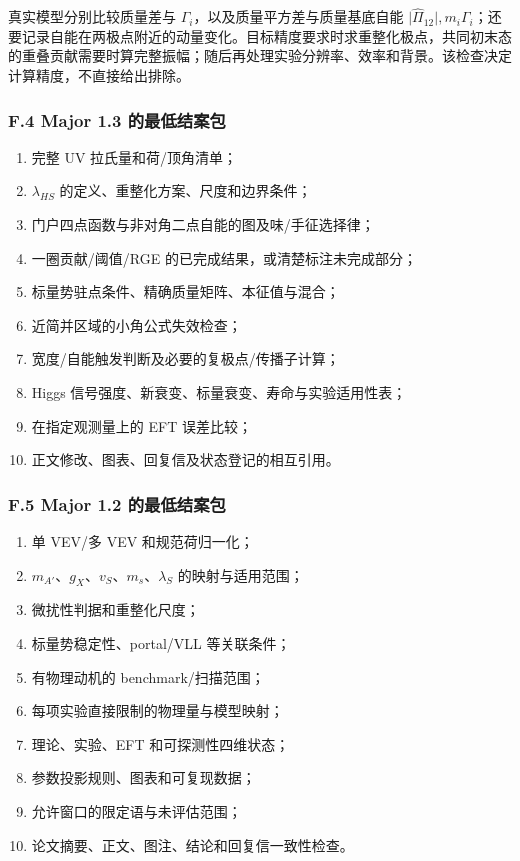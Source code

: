 \documentclass[
  chinese,
  UTF8]{ctexart}
\providecommand{\tightlist}{%
  \setlength{\itemsep}{0pt}\setlength{\parskip}{0pt}}
\begin{document}
真实模型分别比较质量差与 \(\Gamma_i\)，以及质量平方差与质量基底自能
\(\lvert\widehat\Pi_{12}\rvert,m_i\Gamma_i\)；还要记录自能在两极点附近的动量变化。目标精度要求时求重整化极点，共同初末态的重叠贡献需要时算完整振幅；随后再处理实验分辨率、效率和背景。该检查决定计算精度，不直接给出排除。

\subsubsection{F.4 Major 1.3
的最低结案包}\label{f.4-major-1.3-ux7684ux6700ux4f4eux7ed3ux6848ux5305}

\begin{enumerate}
\def\labelenumi{\arabic{enumi}.}
\tightlist
\item
  完整 UV 拉氏量和荷/顶角清单；
\item
  \(\lambda_{HS}\) 的定义、重整化方案、尺度和边界条件；
\item
  门户四点函数与非对角二点自能的图及味/手征选择律；
\item
  一圈贡献/阈值/RGE 的已完成结果，或清楚标注未完成部分；
\item
  标量势驻点条件、精确质量矩阵、本征值与混合；
\item
  近简并区域的小角公式失效检查；
\item
  宽度/自能触发判断及必要的复极点/传播子计算；
\item
  Higgs 信号强度、新衰变、标量衰变、寿命与实验适用性表；
\item
  在指定观测量上的 EFT 误差比较；
\item
  正文修改、图表、回复信及状态登记的相互引用。
\end{enumerate}

\subsubsection{F.5 Major 1.2
的最低结案包}\label{f.5-major-1.2-ux7684ux6700ux4f4eux7ed3ux6848ux5305}

\begin{enumerate}
\def\labelenumi{\arabic{enumi}.}
\tightlist
\item
  单 VEV/多 VEV 和规范荷归一化；
\item
  \(m_{A'}\)、\(g_X\)、\(v_S\)、\(m_s\)、\(\lambda_S\)
  的映射与适用范围；
\item
  微扰性判据和重整化尺度；
\item
  标量势稳定性、portal/VLL 等关联条件；
\item
  有物理动机的 benchmark/扫描范围；
\item
  每项实验直接限制的物理量与模型映射；
\item
  理论、实验、EFT 和可探测性四维状态；
\item
  参数投影规则、图表和可复现数据；
\item
  允许窗口的限定语与未评估范围；
\item
  论文摘要、正文、图注、结论和回复信一致性检查。
\end{enumerate}
\end{document}
